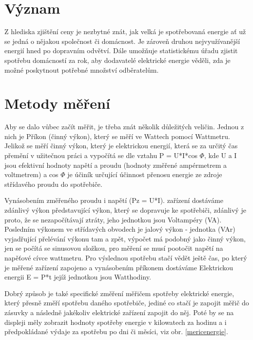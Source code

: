 \documentclass[FM,RP]{tulthesis}
\begin{document}
    \section {Význam}
     Z hlediska zjištění ceny je nezbytné znát, jak velká je spotřebovaná energie ať už se jedná o nějakou společnost či domácnost. Je zároveň druhou nejvyužívanější energií hned po dopravním odvětví. Dále umožňuje statistickému úřadu zjistit spotřebu domácností za rok, aby dodavatelé elektrické energie věděli, zda je možné poskytnout potřebné množství odběratelům.
     \cite{kalkulackaenergie}
   \section {Metody měření}
   Aby se dalo vůbec začít měřit, je třeba znát několik důležitých veličin. Jednou z nich je Příkon (činný výkon), který se měří ve Wattech pomocí Wattmetru. Jelikož se měří činný výkon, který je  elektrickou energií, která se za určitý čas přemění v užitečnou práci a vypočítá se dle vztahu P = U*I*cos $\Phi$, kde U a I jsou efektivní hodnoty napětí a proudu (hodnoty změřené ampérmetrem a voltmetrem) a cos $\Phi$ je účiník určující účinnost přenosu energie ze zdroje střídavého proudu do spotřebiče. 
   
   Vynásobením změřeného proudu i napětí (Pz = U*I). zařízení dostáváme 
   zdánlivý výkon představující výkon, který se dopravuje ke spotřebiči, zdánlivý je proto, že se nezapočítávají ztráty, jeho jednotkou jsou Voltampéry (VA). Posledním výkonem ve střídavých obvodech je jalový výkon - jednotka (VAr) vyjadřující přelévání výkonu tam a zpět, výpočet má podobný jako činný výkon, jen se počítá se sinusovou složkou, pro měření se musí pootočit napětí na napěťové cívce wattmetru. Pro výslednou spotřebu stačí vědět ještě čas, po který je měřené zařízení zapojeno a vynásobením příkonem dostáváme Elektrickou energii E = P*t jejíž jednotkou jsou Watthodiny. 
   
   Dobrý způsob je také specifické změření měřičem spotřeby elektrické energie, který přesně změří spotřebu daného spotřebiče, jediné co stačí je zapojit měřič do zásuvky a následně jakékoliv elektrické zařízení zapojit do něj. Poté by se na displeji měly zobrazit hodnoty spotřeby energie v kilowatech za hodinu a i předpokládané výdaje za spotřebu po dni či měsíci, viz obr. \ref{mericenergie}. \cite{vykon}
    
\end{document}
